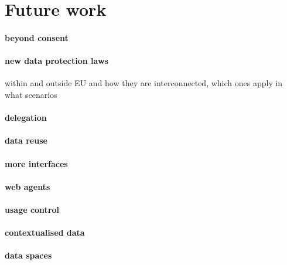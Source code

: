 \section{Future work}
\label{sec:future_work}


\paragraph{beyond consent}

\paragraph{new data protection laws} within and outside EU and how they are interconnected, which ones apply in what scenarios

\paragraph{delegation}

\paragraph{data reuse}

\paragraph{more interfaces}

\paragraph{web agents}

\paragraph{usage control}

\paragraph{contextualised data}

\paragraph{data spaces}